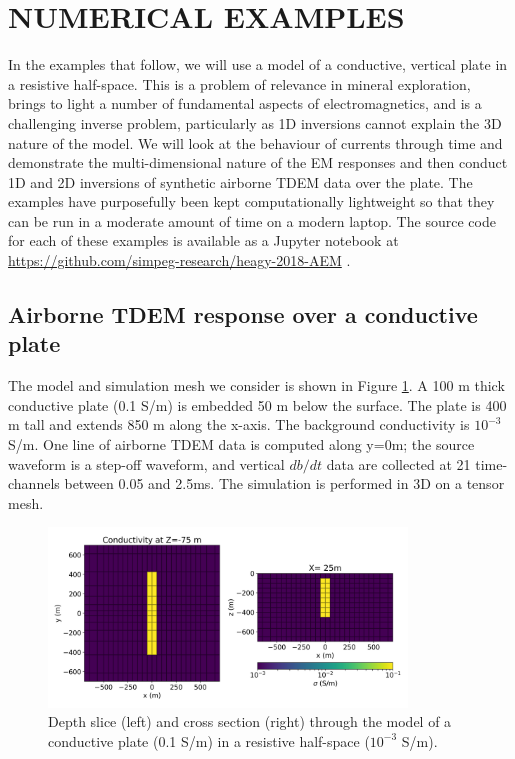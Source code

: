 \documentclass[paper]{geophysics}
\begin{document}
\section{NUMERICAL EXAMPLES}
In the examples that follow, we will use a model of a conductive, vertical plate in a resistive half-space. This is a problem of relevance in mineral exploration, brings to light a number of fundamental aspects of electromagnetics, and is a challenging inverse problem, particularly as 1D inversions cannot explain the 3D nature of the model. We will look at the behaviour of currents through time and demonstrate the multi-dimensional nature of the EM responses and then conduct 1D and 2D inversions of synthetic airborne TDEM data over the plate. The examples have purposefully been kept computationally lightweight so that they can be run in a moderate amount of time on a modern laptop. The source code for each of these examples is available as a Jupyter notebook at
\href{https://github.com/simpeg-research/heagy-2018-AEM}{https://github.com/simpeg-research/heagy-2018-AEM} \citep{Heagy2018}.

\subsection{Airborne TDEM response over a conductive plate}
The model and simulation mesh we consider is shown in Figure \ref{fig:model}. A 100 m thick conductive plate (0.1 S/m) is embedded 50 m below the surface. The plate is 400 m tall and extends 850 m along the x-axis. The background conductivity is $10^{-3}$ S/m. One line of airborne TDEM data is computed along y=0m; the source waveform is a step-off waveform, and vertical $db/dt$ data are collected at 21 time-channels between 0.05 and 2.5ms. The simulation is performed in 3D on a tensor mesh.

\begin{figure}[!htb]
  \centering
  \includegraphics[width=0.85\textwidth]{figures/model.png}
  \caption{Depth slice (left) and cross section (right) through the model of a conductive plate (0.1 S/m) in a resistive half-space ($10^{-3}$ S/m).}
  \label{fig:model}
\end{figure}
\end{document}
